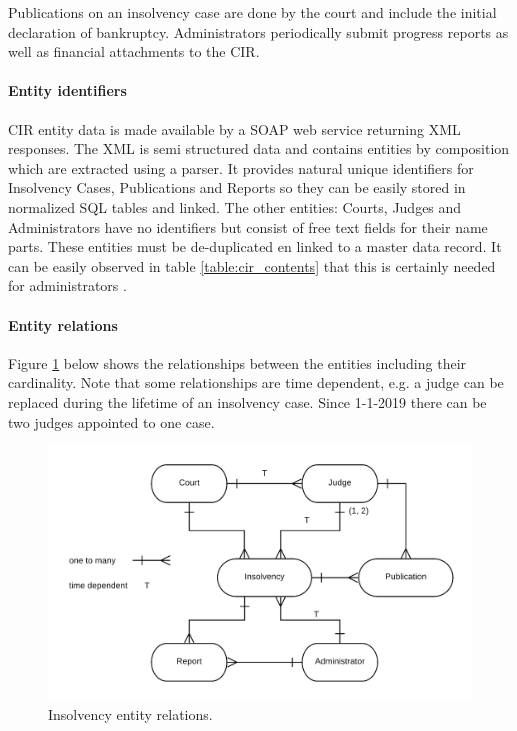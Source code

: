 Publications on an insolvency case are done by the court and include the initial declaration of bankruptcy. Administrators periodically submit progress reports as well as financial attachments to the CIR.

\paragraph{Entity identifiers}
CIR entity data is made available by a SOAP web service returning XML responses. The XML is semi structured data and contains entities by composition which are extracted using a parser. It provides natural unique identifiers for Insolvency Cases, Publications and Reports	so they can be easily stored in normalized SQL tables and linked. The other entities: Courts, Judges and Administrators have no identifiers but consist of free text fields for their name parts. These entities must be de-duplicated en linked to a master data record. It can be easily observed in table \ref{table:cir_contents} that this is certainly needed for administrators .

\paragraph{Entity relations}
Figure \ref{fig:cir-erd} below shows the relationships between the entities including their cardinality. Note that some relationships are time dependent, e.g. a judge can be replaced during the lifetime of an insolvency case. Since 1-1-2019 there can be two judges appointed to one case.

\begin{figure}[h]
	\includegraphics[width=1\linewidth]{images/cir_erd_2.png}
	\caption{Insolvency entity relations.}
	\label{fig:cir-erd}
\end{figure}

